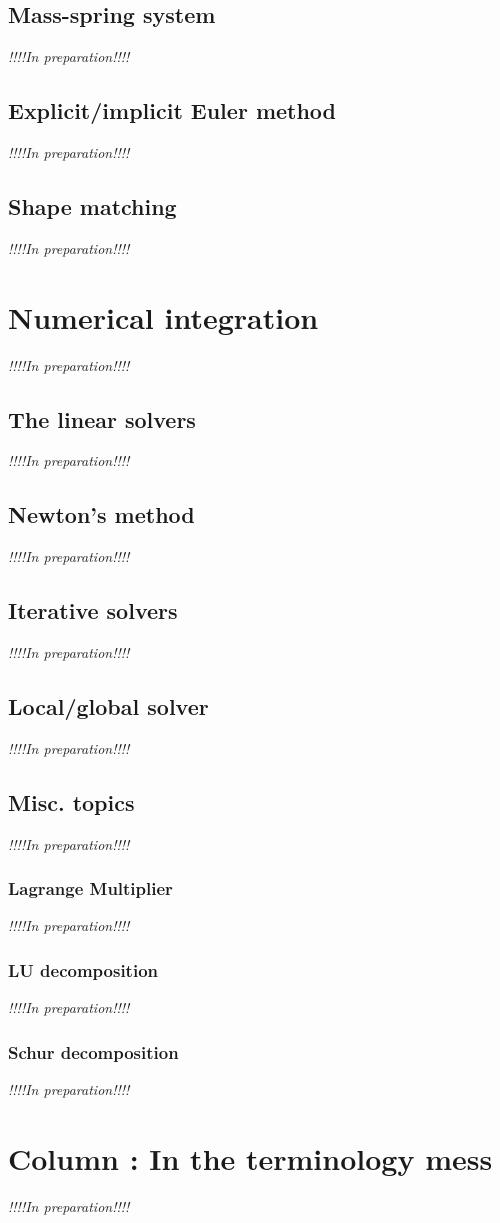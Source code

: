 \documentclass[pdflatex,sn-mathphys-num]{sn-jnl}%
\theoremstyle{thmstyleone}%
\theoremstyle{thmstyletwo}%
\theoremstyle{thmstylethree}%
\newcommand{\inprep}{
	\begin{center}
		\sl\rm {!!!!In preparation!!!!}
\end{center}}
\begin{document}
\subsection{Mass-spring system}
\inprep
\subsection{Explicit/implicit Euler method}
\inprep
\subsection{Shape matching}
\inprep

\section{Numerical integration}
\inprep
\subsection{The linear solvers}
\inprep
\subsection{Newton's method}
\inprep
\subsection{Iterative solvers}
\inprep
\subsection{Local/global solver}
\inprep
\subsection{Misc. topics}
\inprep
\subsubsection{Lagrange Multiplier}
\inprep
\subsubsection{LU decomposition}
\inprep
\subsubsection{Schur decomposition}
\inprep

\section{Column : In the terminology mess}
\inprep
\end{document}
